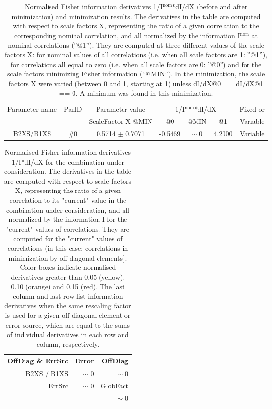 \begin{table}[H]
\scriptsize
\begin{center}
\renewcommand{\arraystretch}{1.1}
\begin{tabular}{|c|c|c|ccc|c|}
\hline
Parameter name & ParID & Parameter value &\multicolumn{3}{|c|}{1/I$^\mathrm{nom}$*dI/dX} & Fixed or\\
 & & ScaleFactor X @MIN & @0 & @MIN & @1 & Variable\\
\hline
 {\tiny B2XS/B1XS} & \#0 &    0.5714 $\pm$    0.7071 &   -0.5469 & {\tiny $\sim$ }0 &    4.2000 & Variable \\
\hline
\end{tabular}
\renewcommand{\arraystretch}{1}
\caption{Normalised Fisher information derivatives 1/I$^\mathrm{nom}$*dI/dX (before and after minimization) and minimization results.  The derivatives in the table are computed with respect to scale factors X, representing the ratio of a given correlation to the corresponding nominal correlation, and all normalized by the information I$^\mathrm{nom}$ at nominal correlations (''@1''). They are computed at three different values of the scale factors X: for nominal values of all correlations (i.e. when all scale factors are 1: ''@1''), for correlations all equal to zero (i.e. when all scale factors are 0: ''@0'') and for the scale factors minimizing Fisher information (''@MIN''). In the minimization, the scale factors X were varied (between 0 and 1, starting at 1) unless dI/dX@0 == dI/dX@1 == 0. A minimum was found in this minimization.}
\end{center}
\end{table}
\begin{table}[H]
\scriptsize
\begin{center}
\renewcommand{\arraystretch}{1.1}
\begin{tabular}{|r|r|r|}
\hline
 OffDiag \& ErrSrc & {\tiny Error} & OffDiag\\
\hline
B2XS / B1XS &  {\tiny $\sim$ }0 &  {\tiny $\sim$ }0 \\
\hline
\multirow{2}{*}{ErrSrc} & \multirow{2}{*}{ {\tiny $\sim$ }0} & GlobFact\\
 & &  {\tiny $\sim$ }0 \\
\hline
\end{tabular}
\renewcommand{\arraystretch}{1}
\caption{Normalised Fisher information derivatives 1/I*dI/dX for the combination under consideration. The derivatives in the table are computed with respect to scale factors X, representing the ratio of a given correlation to its "current" value in the combination under consideration, and all normalized by the information I for the "current" values of correlations. They are computed for the "current" values of correlations (in this case: correlations in minimization by off-diagonal elements). Color boxes indicate normalised derivatives greater than 0.05 (yellow), 0.10 (orange) and 0.15 (red). The last column and last row list information derivatives when the same rescaling factor is used for a given off-diagonal element or error source, which are equal to the sums of individual derivatives in each row and column, respectively.}
\end{center}
\end{table}
